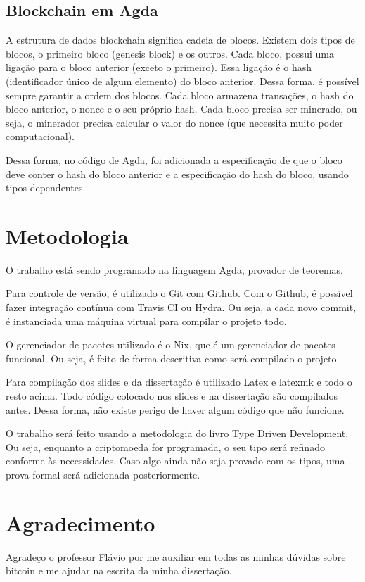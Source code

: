 \documentclass[12pt]{article}
\begin{document}
\subsection{Blockchain em Agda}

A estrutura de dados blockchain significa cadeia de blocos. Existem dois tipos de blocos, o primeiro bloco (genesis block) e os outros. Cada bloco, possui uma ligação para o bloco anterior (exceto o primeiro).
Essa ligação é o hash (identificador único de algum elemento) do bloco anterior. Dessa forma, é possível sempre garantir a ordem dos blocos. Cada bloco armazena transações, o hash do bloco anterior, o nonce e o seu próprio hash. Cada bloco precisa ser minerado, ou seja, o minerador precisa calcular o valor do nonce (que necessita muito poder computacional).

Dessa forma, no código de Agda, foi adicionada a especificação de que o bloco deve conter o hash do bloco anterior e a especificação do hash do bloco, usando tipos dependentes.

\section{Metodologia}

O trabalho está sendo programado na linguagem Agda, provador de teoremas. 

Para controle de versão, é utilizado o Git com Github.
Com o Github, é possível fazer integração contínua com Travis CI ou Hydra.
Ou seja, a cada novo commit, é instanciada uma máquina virtual para compilar o projeto todo.

O gerenciador de pacotes utilizado é o Nix, que é um gerenciador de pacotes funcional. 
Ou seja, é feito de forma descritiva como será compilado o projeto.

Para compilação dos slides e da dissertação é utilizado Latex e latexmk e todo o resto acima.
Todo código colocado nos slides e na dissertação são compilados antes. Dessa forma, não existe perigo de haver algum código que não funcione.

O trabalho será feito usando a metodologia do livro Type Driven Development. Ou seja, enquanto a criptomoeda for programada, o seu tipo será refinado conforme às necessidades. Caso algo ainda não seja provado com os tipos, uma prova formal será adicionada posteriormente.

\section{Agradecimento}

Agradeço o professor Flávio por me auxiliar em todas as minhas dúvidas sobre bitcoin e me ajudar na escrita da minha dissertação. 

\newpage
 


\end{document}
